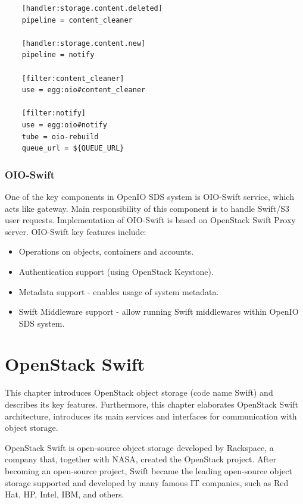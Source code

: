     \lstset{
        caption=Example of event-agent handler configuration,
        label=lst:event-agent-handlers
    }
    \begin{minipage}{\linewidth}
    \begin{lstlisting}
    [handler:storage.content.deleted]
    pipeline = content_cleaner

    [handler:storage.content.new]
    pipeline = notify

    [filter:content_cleaner]
    use = egg:oio#content_cleaner

    [filter:notify]
    use = egg:oio#notify
    tube = oio-rebuild
    queue_url = ${QUEUE_URL}
    \end{lstlisting}
    \end{minipage}

    \subsection{OIO-Swift}
    One of the key components in OpenIO SDS system is OIO-Swift service, which acts like gateway. Main responsibility of this component is to handle Swift/S3 user requests. Implementation of OIO-Swift is based on OpenStack Swift Proxy server. OIO-Swift key features include:
    \begin{itemize}
        \item Operations on objects, containers and accounts.
        \item Authentication support (using OpenStack Keystone).
        \item Metadata support - enables usage of system metadata.
        \item Swift Middleware support - allow running Swift middlewares within OpenIO SDS system.
    \end{itemize}

\chapter{OpenStack Swift}\label{chap:swift}
    This chapter introduces OpenStack object storage (code name Swift) and describes its key features. Furthermore, this chapter elaborates OpenStack Swift architecture, introduces its main services and interfaces for communication with object storage.

    OpenStack Swift is open-source object storage developed by Rackspace, a company that, together with NASA, created the OpenStack project. After becoming an open-source project, Swift became the leading open-source object storage supported and developed by many famous IT companies, such as Red Hat, HP, Intel, IBM, and others.

